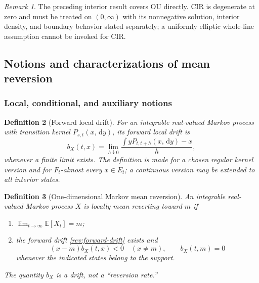 \documentclass[11pt]{article}
\newtheorem{definition}{Definition}[section]
\theoremstyle{remark}
\newtheorem{remark}[definition]{Remark}
\newcommand{\E}{\mathbb E}
\newcommand{\dd}{\,\mathrm d}
\begin{document}
\begin{remark}
The preceding interior result covers OU directly.  CIR is degenerate at zero
and must be treated on $(0,\infty)$ with its nonnegative solution, interior
density, and boundary behavior stated separately; a uniformly elliptic
whole-line assumption cannot be invoked for CIR.
\end{remark}

\subsection{Notions and characterizations of mean reversion}

\subsubsection{Local, conditional, and auxiliary notions}

\begin{definition}[Forward local drift]
\label{rev:def-forward-drift}
For an integrable real-valued Markov process with transition kernel
$P_{s,t}(x,\dd y)$, its forward local drift is
\begin{equation}
b_X(t,x)=\lim_{h\downarrow0}
\frac{\int yP_{t,t+h}(x,\dd y)-x}{h},
\label{rev:forward-drift}
\end{equation}
whenever a finite limit exists.  The definition is made for a chosen regular
kernel version and for $F_t$-almost every $x\in E_t$; a continuous version may
be extended to all interior states.
\end{definition}

\begin{definition}[One-dimensional Markov mean reversion]
\label{rev:def-local-mr}
An integrable real-valued Markov process $X$ is \emph{locally mean reverting
toward $m$} if
\begin{enumerate}[label=(\roman*)]
\item $\lim_{t\to\infty}\E[X_t]=m$;
\item the forward drift \eqref{rev:forward-drift} exists and
\begin{equation}
(x-m)b_X(t,x)<0\quad(x\ne m),
\qquad b_X(t,m)=0
\label{rev:local-sign}
\end{equation}
whenever the indicated states belong to the support.
\end{enumerate}
The quantity $b_X$ is a drift, not a ``reversion rate.''
\end{definition}
\end{document}
